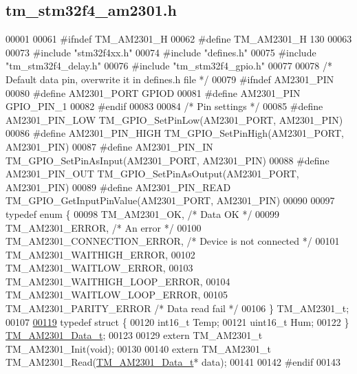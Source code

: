 \hypertarget{tm__stm32f4__am2301_8h_source}{}\subsection{tm\+\_\+stm32f4\+\_\+am2301.\+h}

\begin{DoxyCode}
00001 
00061 \textcolor{preprocessor}{#ifndef TM\_AM2301\_H}
00062 \textcolor{preprocessor}{#define TM\_AM2301\_H 130}
00063 
00073 \textcolor{preprocessor}{#include "stm32f4xx.h"}
00074 \textcolor{preprocessor}{#include "defines.h"}
00075 \textcolor{preprocessor}{#include "tm\_stm32f4\_delay.h"}
00076 \textcolor{preprocessor}{#include "tm\_stm32f4\_gpio.h"}
00077 
00078 \textcolor{comment}{/* Default data pin, overwrite it in defines.h file */}
00079 \textcolor{preprocessor}{#ifndef AM2301\_PIN}
00080 \textcolor{preprocessor}{#define AM2301\_PORT             GPIOD}
00081 \textcolor{preprocessor}{#define AM2301\_PIN              GPIO\_PIN\_1}
00082 \textcolor{preprocessor}{#endif}
00083 
00084 \textcolor{comment}{/* Pin settings */}
00085 \textcolor{preprocessor}{#define AM2301\_PIN\_LOW          TM\_GPIO\_SetPinLow(AM2301\_PORT, AM2301\_PIN)}
00086 \textcolor{preprocessor}{#define AM2301\_PIN\_HIGH         TM\_GPIO\_SetPinHigh(AM2301\_PORT, AM2301\_PIN)}
00087 \textcolor{preprocessor}{#define AM2301\_PIN\_IN           TM\_GPIO\_SetPinAsInput(AM2301\_PORT, AM2301\_PIN)}
00088 \textcolor{preprocessor}{#define AM2301\_PIN\_OUT          TM\_GPIO\_SetPinAsOutput(AM2301\_PORT, AM2301\_PIN)}
00089 \textcolor{preprocessor}{#define AM2301\_PIN\_READ         TM\_GPIO\_GetInputPinValue(AM2301\_PORT, AM2301\_PIN)}
00090 
00097 \textcolor{keyword}{typedef} \textcolor{keyword}{enum} \{
00098     TM\_AM2301\_OK,                       \textcolor{comment}{/* Data OK */}
00099     TM\_AM2301\_ERROR,                    \textcolor{comment}{/* An error */}
00100     TM\_AM2301\_CONNECTION\_ERROR,         \textcolor{comment}{/* Device is not connected */}
00101     TM\_AM2301\_WAITHIGH\_ERROR,
00102     TM\_AM2301\_WAITLOW\_ERROR,
00103     TM\_AM2301\_WAITHIGH\_LOOP\_ERROR,
00104     TM\_AM2301\_WAITLOW\_LOOP\_ERROR,
00105     TM\_AM2301\_PARITY\_ERROR              \textcolor{comment}{/* Data read fail */}
00106 \} TM\_AM2301\_t;
00107 
\hypertarget{tm__stm32f4__am2301_8h_source_l00119}{}\hyperlink{struct_t_m___a_m2301___data__t}{00119} \textcolor{keyword}{typedef} \textcolor{keyword}{struct }\{
00120     int16\_t Temp;
00121     uint16\_t Hum;
00122 \} \hyperlink{struct_t_m___a_m2301___data__t}{TM\_AM2301\_Data\_t};
00123 
00129 \textcolor{keyword}{extern} TM\_AM2301\_t TM\_AM2301\_Init(\textcolor{keywordtype}{void});
00130 
00140 \textcolor{keyword}{extern} TM\_AM2301\_t TM\_AM2301\_Read(\hyperlink{struct_t_m___a_m2301___data__t}{TM\_AM2301\_Data\_t}* data);
00141 
00142 \textcolor{preprocessor}{#endif}
00143 
\end{DoxyCode}
